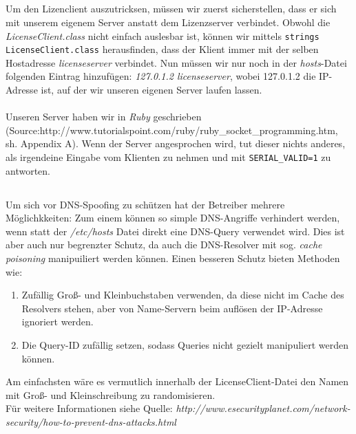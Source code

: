 \documentclass{scrartcl}
\begin{document}
    \subsection{}
    \label{sub:3.2}
      Um den Lizenclient auszutricksen, müssen wir zuerst sicherstellen, dass
      er sich mit unserem eigenem Server anstatt dem Lizenzserver verbindet.
      Obwohl die \textit{LicenseClient.class} nicht einfach auslesbar ist,
      können wir mittels \texttt{strings LicenseClient.class} herausfinden,
      dass der Klient immer mit der selben Hostadresse \textit{licenseserver}
      verbindet.
      Nun müssen wir nur noch in der \textit{hosts}-Datei folgenden Eintrag
      hinzufügen: \textit{127.0.1.2 licenseserver}, wobei 127.0.1.2 die
      IP-Adresse ist, auf der wir unseren eigenen Server laufen lassen.\\\\
      Unseren Server haben wir in \textit{Ruby} geschrieben\\
      (Source:http://www.tutorialspoint.com/ruby/ruby\_socket\_programming.htm,
      sh. Appendix A). Wenn der Server angesprochen wird, tut dieser nichts
      anderes, als irgendeine Eingabe vom Klienten zu nehmen und mit
      \texttt{SERIAL\_VALID=1} zu antworten.
    \subsection{}
    \label{sub:3.3}
      Um sich vor DNS-Spoofing zu schützen hat der Betreiber mehrere
      Möglichkkeiten: Zum einem können so simple DNS-Angriffe verhindert werden,
      wenn statt der \textit{/etc/hosts} Datei direkt eine DNS-Query verwendet
      wird. Dies ist aber auch nur begrenzter Schutz, da auch die DNS-Resolver
      mit sog. \textit{cache poisoning} manipuiliert werden können. Einen
      besseren Schutz bieten Methoden wie: \\
      \begin{enumerate}
        \item Zufällig Groß- und Kleinbuchstaben verwenden, da diese nicht im
              Cache des Resolvers stehen, aber von Name-Servern beim auflösen
              der IP-Adresse ignoriert werden.
        \item Die Query-ID zufällig setzen, sodass Queries nicht gezielt
              manipuliert werden können.
      \end{enumerate}
      Am einfachsten wäre es vermutlich innerhalb der LicenseClient-Datei den
      Namen mit Groß- und Kleinschreibung zu randomisieren.\\
      Für weitere Informationen siehe Quelle:
      \textit{http://www.esecurityplanet.com/network-security/how-to-prevent-dns-attacks.html}
\end{document}
